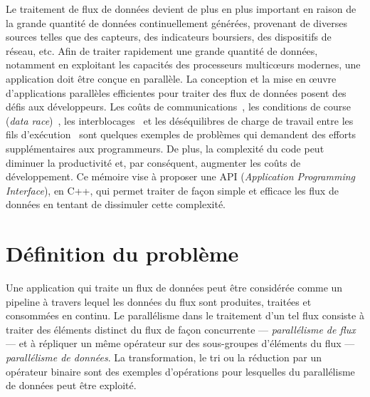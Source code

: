 \begin{introduction}

Le traitement de flux de donn\'ees devient de plus en plus important en raison de la grande quantit\'e de donn\'ees continuellement g\'en\'er\'ees, provenant de diverses sources telles que des capteurs, des indicateurs boursiers, des dispositifs de r\'eseau, etc. Afin de traiter rapidement une grande quantit\'e de donn\'ees, notamment en exploitant les capacit\'es des processeurs multicœurs modernes, une application doit \^etre con\c cue en parall\`ele. La conception et la mise en œuvre d'applications parall\`eles efficientes pour traiter des flux de donn\'ees posent des d\'efis aux d\'eveloppeurs. Les co\^uts de communications~\citep{amarasinghe2011ascr}, les conditions de course (\emph{data race})~\citep{wu2015detecting}, les interblocages~\citep{haque2006concurrent} et les d\'es\'equilibres de charge de travail entre les fils d'ex\'ecution~\citep{amarasinghe2011ascr} sont quelques exemples de probl\`emes qui demandent des efforts suppl\'ementaires aux programmeurs. De plus, la complexit\'e du code peut diminuer la productivit\'e et, par cons\'equent, augmenter les co\^uts de d\'eveloppement. Ce m\'emoire vise \`a proposer une API (\emph{Application Programming Interface}), en C++, qui permet traiter de fa\c con simple et efficace les flux de donn\'ees en tentant de dissimuler cette complexit\'e.

\section*{D\'efinition du probl\`eme}

Une application qui traite un flux de données peut \^etre consid\'er\'ee comme un pipeline \`a travers lequel les donn\'ees du flux sont produites, trait\'ees et consomm\'ees en continu. Le parall\'elisme dans le traitement d'un tel flux consiste \`a traiter des \'el\'ements distinct du flux de fa\c{c}on concurrente --- \emph{parall\'elisme de flux} --- et \`a r\'epliquer un m\^eme op\'erateur sur des sous-groupes d'\'el\'ements du flux --- \emph{parall\'elisme de donn\'ees}. La transformation, le tri ou la r\'eduction par un op\'erateur binaire sont des exemples d'op\'erations pour lesquelles du parall\'elisme de donn\'ees peut \^etre exploit\'e. 





\end{introduction}
